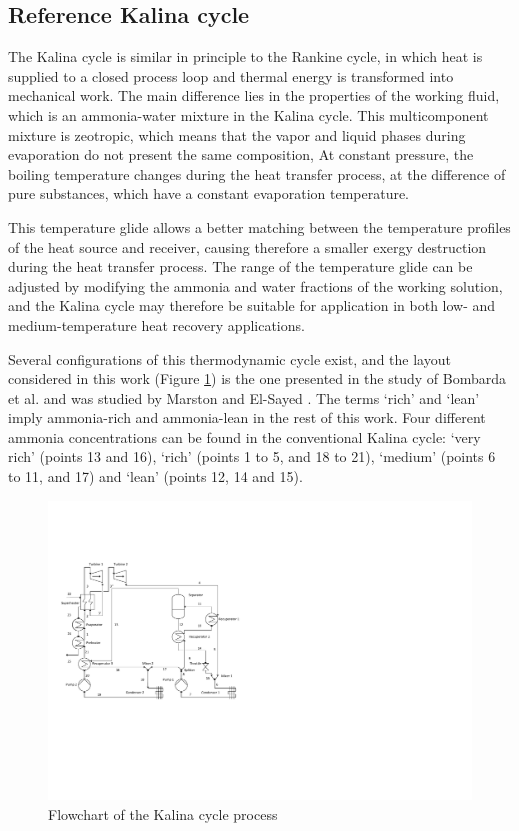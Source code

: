 \documentclass[final,times,3p]{elsarticle}
\begin{document}
\subsection{Reference Kalina cycle}
\label{sec:kalina_cycle}

The Kalina cycle is similar in principle to the Rankine cycle, in which heat is supplied to a closed process loop and thermal energy is transformed into mechanical work. The main difference lies in the properties of the working fluid, which is an ammonia-water mixture in the Kalina cycle. This multicomponent mixture is zeotropic, which means that the vapor and liquid phases during evaporation do not present the same composition, At constant pressure, the boiling temperature changes during the heat transfer process, at the difference of pure substances, which have a constant evaporation temperature. 

This temperature glide allows a better matching between the temperature profiles of the heat source and receiver, causing therefore a smaller exergy destruction during the heat transfer process. The range of the temperature glide can be adjusted by modifying the ammonia and water fractions of the working solution, and the Kalina cycle may therefore be suitable for application in both low- and medium-temperature heat recovery applications.  

Several configurations of this thermodynamic cycle exist, and the layout considered in this work (Figure \ref{fig:kalina_cycle}) is the one presented in the study of Bombarda et al. \cite{Bombarda2010b} and was studied by Marston \cite{Marston1990,Marston1995} and El-Sayed \cite{El-Sayed1985}. The terms `rich' and `lean'  imply ammonia-rich and ammonia-lean in the rest of this work. Four different ammonia concentrations can be found in the conventional Kalina cycle: `very rich' (points 13 and 16), `rich' (points 1 to 5, and 18 to 21), `medium' (points 6 to 11, and 17) and  `lean' (points 12, 14 and 15). 

\begin{figure}[htbp]
\centering
\includegraphics[scale=0.65]{Drawing_Kalina_Baseline.pdf}
\caption{Flowchart of the Kalina cycle process}
\label{fig:kalina_cycle}
\end{figure}
\end{document}
